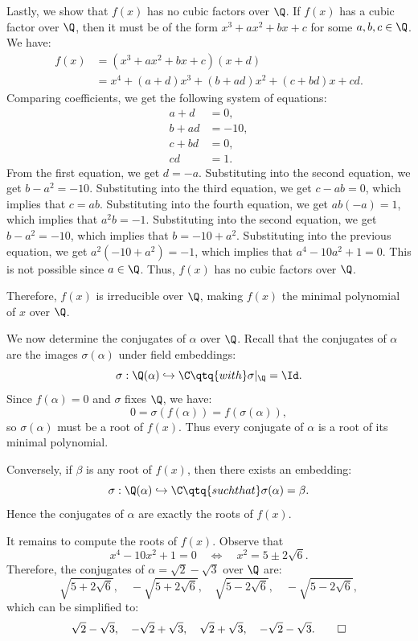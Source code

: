 \begin{solution}
  Lastly, we show that $f(x)$ has no cubic factors over $\Q$. If $f(x)$ has a cubic factor over $\Q$, then it must be of the form $x^3 + ax^2 + bx + c$ for some $a, b, c \in \Q$. We have:
  \begin{align*}
    f(x) &= (x^3 + ax^2 + bx + c)(x + d) \\
    &= x^4 + (a + d)x^3 + (b + ad)x^2 + (c + bd)x + cd
  .\end{align*}
  Comparing coefficients, we get the following system of equations:
  \begin{align*}
    a + d &= 0, \\
    b + ad &= -10, \\
    c + bd &= 0, \\
    cd &= 1
  .\end{align*}
  From the first equation, we get $d = -a$. Substituting into the second equation, we get $b - a^2 = -10$. Substituting into the third equation, we get $c - ab = 0$, which implies that $c = ab$. Substituting into the fourth equation, we get $ab(-a) = 1$, which implies that $a^2b = -1$. Substituting into the second equation, we get $b - a^2 = -10$, which implies that $b = -10 + a^2$. Substituting into the previous equation, we get $a^2(-10 + a^2) = -1$, which implies that $a^4 - 10a^2 + 1 = 0$. This is not possible since $a \in \Q$. Thus, $f(x)$ has no cubic factors over $\Q$.

  Therefore, $f(x)$ is irreducible over $\Q$, making $f(x)$ the minimal polynomial of $x$ over $\Q$.

  We now determine the conjugates of $\alpha$ over $\Q$. Recall that the conjugates of $\alpha$ are the images $\sigma(\alpha)$ under field embeddings:
  \[%
    \sigma : \Q(\alpha) \hookrightarrow \C \qtq{with} \sigma|_{\Q} = \Id
  .\]%
  Since $f(\alpha) = 0$ and $\sigma$ fixes $\Q$, we have:
  \[%
    0 = \sigma(f(\alpha)) = f(\sigma(\alpha))
  ,\]%
  so $\sigma(\alpha)$ must be a root of $f(x)$. Thus every conjugate of $\alpha$ is a root of its minimal polynomial.

  Conversely, if $\beta$ is any root of $f(x)$, then there exists an embedding:
  \[%
    \sigma : \Q(\alpha) \hookrightarrow \C \qtq{such that} \sigma(\alpha) = \beta
  .\]%
  Hence the conjugates of $\alpha$ are exactly the roots of $f(x)$.

  It remains to compute the roots of $f(x)$. Observe that
  \[%
    x^4 - 10x^2 + 1 = 0 \quad \Longleftrightarrow \quad x^2 = 5 \pm 2\sqrt{6}
  .\]%
  Therefore, the conjugates of $\alpha = \sqrt{2} - \sqrt{3}$ over $\Q$ are:
  \[%
    \sqrt{5 + 2\sqrt{6}}, \quad -\sqrt{5 + 2\sqrt{6}}, \quad \sqrt{5 - 2\sqrt{6}}, \quad -\sqrt{5 - 2\sqrt{6}}
  ,\]%
  which can be simplified to:
  \[%
    \sqrt{2} - \sqrt{3}, \quad -\sqrt{2} + \sqrt{3}, \quad \sqrt{2} + \sqrt{3}, \quad -\sqrt{2} - \sqrt{3}
  .\qedhere\]%
\end{solution}

